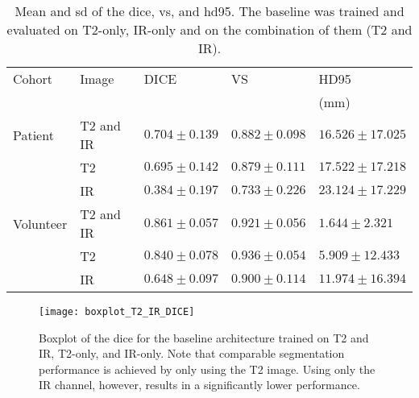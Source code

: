 \begin{table}[htbp]
   \centering
   \caption[Results for Feasibility]{Mean and \gls{sd} of the \acrlong{dice}, \acrlong{vs}, and \acrlong{hd95}. The baseline was trained and evaluated on T2-only, IR-only and on the combination of them (T2 and IR).}
   \begin{tabular}{l*{4}{l}}
      \toprule
      Cohort	& Image  & DICE              & VS				& HD95\\
      			&			&					&					& (mm)\\
      \midrule
      Patient   & T2 and IR & $\mathbf{0.704 \pm 0.139}$& $\mathbf{0.882 \pm 0.098}$ & $\mathbf{16.526 \pm 17.025}$ \\
                & T2        & $0.695 \pm 0.142 $& $0.879 \pm 0.111$ & $ 17.522 \pm 17.218$ \\
                & IR        & $0.384 \pm 0.197 $& $0.733 \pm 0.226$ & $ 23.124 \pm 17.229$ \\
      \midrule
      Volunteer & T2 and IR & $\mathbf{0.861 \pm 0.057 }$& $0.921 \pm 0.056$ & $\mathbf{1.644 \pm 2.321}$ \\
                & T2        & $0.840 \pm 0.078 $& $\mathbf{0.936 \pm 0.054}$ & $ 5.909 \pm 12.433$ \\
                & IR        & $0.648 \pm 0.097 $& $0.900 \pm 0.114$ & $ 11.974 \pm 16.394$ \\
      \bottomrule
   \end{tabular}
   \label{tab:results_feasibility}
\end{table}

\begin{figure}[htbp]
	\centering
	\texttt{[image: boxplot\_T2\_IR\_DICE]}
    \caption[Boxplot of the \acrlong{dice} for the baseline architecture]{Boxplot of the \acrlong{dice} for the baseline architecture trained on T2 and IR, T2-only, and IR-only. Note that comparable segmentation performance is achieved by only using the T2 image. Using only the IR channel, however, results in a significantly lower performance.}
    \label{fig:results_boxplot_T2_IR_dice}
\end{figure}

